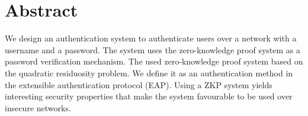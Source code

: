 \section*{Abstract} 
We design an authentication system to authenticate users over a network with a username and a password.
The system uses the zero-knowledge proof system as a password verification mechanism.
The used zero-knowledge proof system based on the quadratic residuosity problem.
We define it as an authentication method in the extensible authentication protocol (EAP).
Using a ZKP system yields interesting security properties that make the system favourable to be used over insecure networks.
\newpage